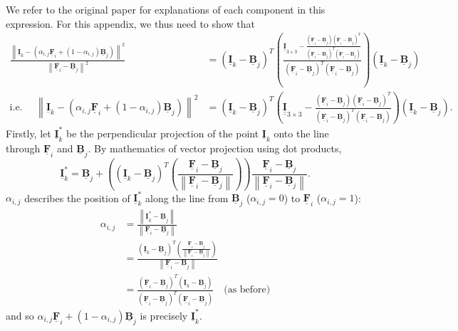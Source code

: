 \documentclass{article}
\theoremstyle{definition}
\def\vt#1{\underline{\mathbf{#1}}}
\def\mt#1{\underline{\underline{\mathbf{#1}}}}
\begin{document}
We refer to the original paper \cite{robust-matting} for explanations of each component in this expression. For this appendix, we thus need to show that
\begin{align*}
    \frac{\left\| \vt I_k - \left( \alpha_{i,j}\vt F_i + (1-\alpha_{i,j})\vt B_j\right)  \right\|^2}{\left\| \vt F_i - \vt B_j \right\|^2} &= \left(\vt I_k - \vt B_j \right)^T          \left( \frac{\mt I_{3\times 3} -  \frac{\left(\vt F_i - \vt B_j\right)\left(\vt F_i - \vt B_j\right)^T}{\left(\vt F_i - \vt B_j\right)^T\left(\vt F_i - \vt B_j\right)}}{\left(\vt F_i - \vt B_j\right)^T\left(\vt F_i - \vt B_j\right)}\right)     \left(\vt I_k - \vt B_j \right)  \\
    \text{i.e.\ }\quad\left\| \vt I_k - \left( \alpha_{i,j}\vt F_i + (1-\alpha_{i,j})\vt B_j\right)  \right\|^2 &= \left(\vt I_k - \vt B_j \right)^T          \left( \mt I_{3\times 3} -  \frac{\left(\vt F_i - \vt B_j\right)\left(\vt F_i - \vt B_j\right)^T}{\left(\vt F_i - \vt B_j\right)^T\left(\vt F_i - \vt B_j\right)}\right)     \left(\vt I_k - \vt B_j \right).
\end{align*}
Firstly, let $\vt I_k^*$ be the perpendicular projection of the point $\vt I_k$ onto the line through $\vt F_i$ and $\vt B_j$. By mathematics of vector projection using dot products,
$$\vt I_k^* = \vt B_j + \left( \left(\vt I_k - \vt B_j\right)^T \left( \frac{\vt F_i - \vt B_j}{\left\| \vt F_i - \vt B_j \right\|}\right) \right) \frac{\vt F_i - \vt B_j}{\left\| \vt F_i - \vt B_j \right\|}.$$
$\alpha_{i,j}$ describes the position of $\vt I_k^*$ along the line from $\vt B_j$ ($\alpha_{i,j}=0$) to $\vt F_i$ ($\alpha_{i,j}=1$):
\begin{align*}
    \alpha_{i,j} &= \frac{\left\| \vt I_k^* - \vt B_j  \right\|}{\left\| \vt F_i - \vt B_j  \right\|}\\
    &= \frac{\left(\vt I_k - \vt B_j\right)^T \left( \frac{\vt F_i - \vt B_j}{\left\| \vt F_i - \vt B_j \right\|}\right)}{\left\| \vt F_i - \vt B_j  \right\|}\\
    &=\frac{\left(\vt F_i - \vt B_j\right)^T\left(\vt I_k - \vt B_j\right)}{\left(\vt F_i - \vt B_j\right)^T\left(\vt F_i - \vt B_j\right)}  \quad\text{(as before)}
\end{align*}
and so $\alpha_{i,j}\vt F_i + (1-\alpha_{i,j})\vt B_j$ is precisely $\vt I_k^*$.
\end{document}
